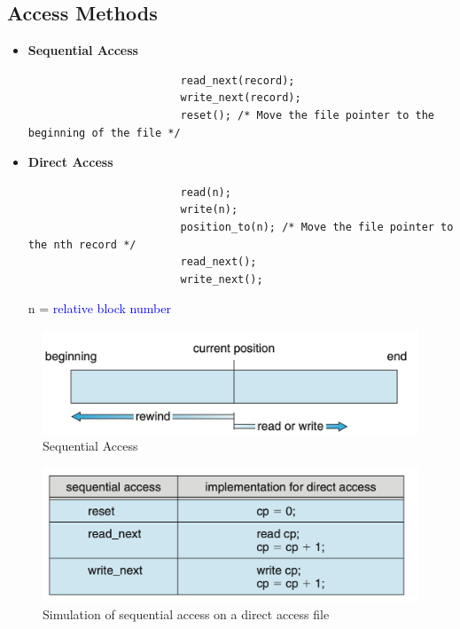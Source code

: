 \documentclass[oneside]{book}
\begin{document}
            \subsection{Access Methods}
                \begin{itemize}
                    \item \textbf{Sequential Access}
                    \begin{verbatim}
                        read_next(record);
                        write_next(record);
                        reset(); /* Move the file pointer to the beginning of the file */ 
                    \end{verbatim}
                    \item \textbf{Direct Access}
                    \begin{verbatim}
                        read(n);
                        write(n);
                        position_to(n); /* Move the file pointer to the nth record */
                        read_next();
                        write_next();
                    \end{verbatim}
                    n = \textcolor{blue}{relative block number}
                \end{itemize}
                \begin{figure}[H]
                    \centering
                    \includegraphics[width=0.6\linewidth]{figures/sequential_access.png}
                    \caption{Sequential Access}
                \end{figure}
                \begin{figure}[H]
                    \centering
                    \includegraphics[width=0.6\linewidth]{figures/sequential_access_sim.png}
                    \caption{Simulation of sequential access on a direct access file}
                \end{figure}
\end{document}
